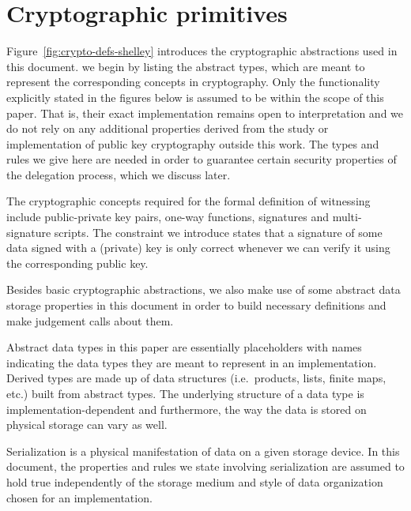 \section{Cryptographic primitives}
\label{sec:crypto-primitives-shelley}

Figure~\ref{fig:crypto-defs-shelley} introduces the cryptographic abstractions used in
this document. we begin by listing the abstract types, which are meant to
represent the corresponding concepts in cryptography. Only the functionality
explicitly stated in the figures below is assumed to be within the scope of this paper.
That is, their exact
implementation remains open to interpretation and we do not rely on
any additional properties derived from the study or implementation of public key
cryptography outside this work. The types and rules we give here are needed in
order to guarantee certain security properties of the delegation process, which
we discuss later.

The cryptographic concepts required for the formal definition of witnessing
include public-private key pairs, one-way functions, signatures and
multi-signature scripts. The constraint we introduce states that a signature of
some data signed with a (private) key is only correct whenever we can verify it
using the corresponding public key.

Besides basic cryptographic abstractions, we also make use of some abstract
data storage properties in this document in order to build necessary definitions
and make judgement calls about them.

Abstract data types in this paper are essentially placeholders with names
indicating the data types they are meant to represent in an implementation.
Derived types are made up of data structures (i.e.~products, lists, finite
maps, etc.) built from abstract types. The underlying structure of a data type
is implementation-dependent and furthermore, the way the data is stored on
physical storage can vary as well.

Serialization is a physical manifestation of data on a given storage device.
In this document, the properties and rules we state involving serialization are
assumed to hold true independently of the storage medium and style of data
organization chosen for an implementation.

